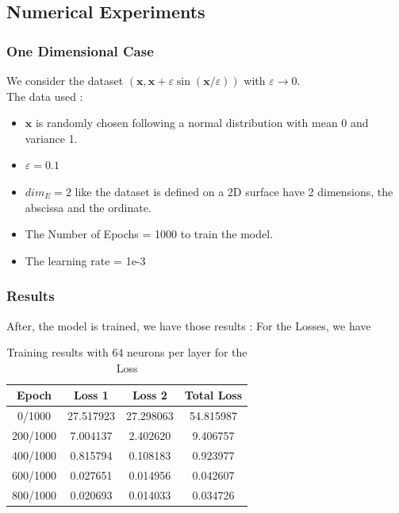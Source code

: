 \documentclass{report}
\begin{document}
    \subsection{Numerical Experiments}
        \subsubsection{One Dimensional Case}
            We consider the dataset $(\mathbf{x}, \mathbf{x}+\varepsilon \sin (\mathbf{x} / \varepsilon))$ with $\varepsilon \rightarrow 0$.
            \\
            The data used :
            \begin{itemize}
                \item $\mathbf{x}$ is randomly chosen following a normal distribution with mean 0 and variance 1.
                \item $\varepsilon = 0.1$
                \item  $dim_E = 2$ like the dataset is defined on a 2D 
                        surface have 2 dimensions, the abscissa and the ordinate.
                \item The Number of Epochs = 1000  to train the model.
                \item The learning rate = 1e-3
            \end{itemize}
        \subsubsection{Results}
            After, the model is trained, we have those results :
            For the Losses, we have 
            \begin{table}[h]
                \centering
                \begin{tabular}{|c|c|c|c|}
                \hline
                Epoch & Loss 1 & Loss 2 & Total Loss \\
                \hline
                0/1000 & 27.517923 & 27.298063 & 54.815987 \\
                200/1000 & 7.004137 & 2.402620 & 9.406757 \\
                400/1000 & 0.815794 & 0.108183 & 0.923977 \\
                600/1000 & 0.027651 & 0.014956 & 0.042607 \\
                800/1000 & 0.020693 & 0.014033 & 0.034726 \\
                \hline
                \end{tabular}
                \caption{Training results with 64 neurons per layer for the Loss}

            \end{table}
\end{document}
